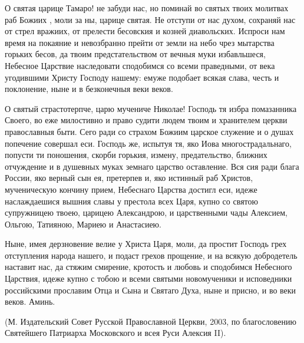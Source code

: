\mychapterending


\begin{mymulticols}

О святая царице Тамаро! не забуди нас, но поминай во святых твоих молитвах раб Божиих , моли за ны, царице святая. Не отступи от нас духом, сохраняй нас от стрел вражиих, от прелести бесовския и козней диавольских. Испроси нам время на покаяние и невозбранно прейти от земли на небо чрез мытарства горьких бесов, да твоим предстательством от вечныя муки избавльшеся, Небесное Царствие наследовати сподобимся со всеми праведными, от века угодившими Христу Господу нашему: емуже подобает всякая слава, честь и поклонение, ныне и в безконечныя веки веков.

\end{mymulticols}

\mychapterending


\begin{mymulticols}




О святый страстотерпче, царю мучениче Николае! Господь тя избра помазанника Своего, во еже милостивно и право судити людем твоим и хранителем церкви православныя быти. Сего ради со страхом Божиим царское служение и о душах попечение совершал еси. Господь же, испытуя тя, яко Иова многострадальнаго, попусти ти поношения, скорби горькия, измену, предательство, ближних отчуждение и в душевных муках земнаго царство оставление. Вся сия ради блага России, яко верный сын ея, претерпев и, яко истинный раб Христов, мученическую кончину прием, Небеснаго Царства достигл еси, идеже наслаждаешися вышния славы у престола всех Царя, купно со святою супружницею твоею, царицею Александрою, и царственными чады Алексием, Ольгою, Татияною, Мариею и Анастасиею.

Ныне, имея дерзновение велие у Христа Царя, моли, да простит Господь грех отступления народа нашего, и подаст грехов прощение, и на всякую добродетель наставит нас, да стяжим смирение, кротость и любовь и сподобимся Небесного Царствия, идеже купно с тобою и всеми святыми новомученики и исповедники российскими прославим Отца и Сына и Святаго Духа, ныне и присно, и во веки веков. Аминь.

(М. Издательский Совет Русской Православной Церкви, 2003, по благословению Святейшего Патриарха Московского и всея Руси Алексия II).

\end{mymulticols}

